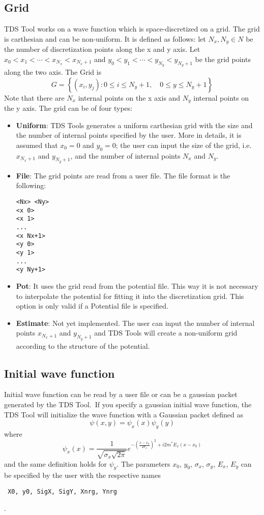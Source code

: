 \documentclass[a4paper,11pt]{article}
\begin{document}
\subsection{Grid}
TDS Tool works on a wave function which is space-discretized on a grid. The grid is carthesian and can be non-uniform. It is defined as follows:
let $N_x, N_y \in N$ be the number of discretization points along the x and y axis.
Let $x_0 < x_1 < \cdots < x_{N_x} < x_{N_x+1}$ and $y_0 < y_1 < \cdots < y_{N_y} < y_{N_y+1}$ be the grid points along the two axis. The Grid is
$$G = \left\{ (x_i, y_j) : 0\leq i \leq N_y+1, \quad 0\leq y \leq N_y+1  \right\}$$
Note that there are $N_x$ internal points on the x axis and $N_y$ internal points on the y axis.
The grid can be of four types:
\begin{itemize}
\item \textbf{Uniform}: TDS Tools generates a uniform carthesian grid with the size and the number of internal points specified by the user. More in details, it is assumed that $x_0 = 0$ and $y_0 = 0$; the user can input the size of the grid, i.e. $x_{N_x+1}$ and $y_{N_y+1}$, and the number of internal points $N_x$ and $N_y$.

\item \textbf{File}: The grid points are read from a user file. The file format is the following:
\begin{verbatim}
<Nx> <Ny>
<x 0>
<x 1>
...
<x Nx+1>
<y 0>
<y 1>
...
<y Ny+1>
\end{verbatim}

\item \textbf{Pot}: It uses the grid read from the potential file. This way it is not necessary to interpolate the potential for fitting it into the discretization grid. This option is only valid if a Potential file is specified.

\item \textbf{Estimate}: Not yet implemented. The user can input the number of internal points $x_{N_x+1}$ and $y_{N_y+1}$ and TDS Tools will create a non-uniform grid according to the structure of the potential.
\end{itemize}


\subsection{Initial wave function}
Initial wave function can be read by a user file or can be a gaussian packet generated by the TDS Tool.\
If you specify a gaussian initial wave function, the TDS Tool will initialize the wave function  with a Gaussian packet defined as $$ \psi(x, y) = \psi_x(x) \psi_y(y) $$
where $$ \psi_x(x) = \frac{1}{\sqrt{\sigma_x \sqrt{2\pi}}}
e ^{-\left(\frac{x-x_0}{2 \sigma_x}\right)^2 + i2m^*E_x(x-x_0)} $$
and the same definition holds for $\psi_y$.
The parameters $x_0$, $y_0$, $\sigma_x$, $\sigma_y$, $E_x$, $E_y$ can be specified by the user with the respective names \begin{verbatim} X0, y0, SigX, SigY, Xnrg, Ynrg \end{verbatim}.
\end{document}
